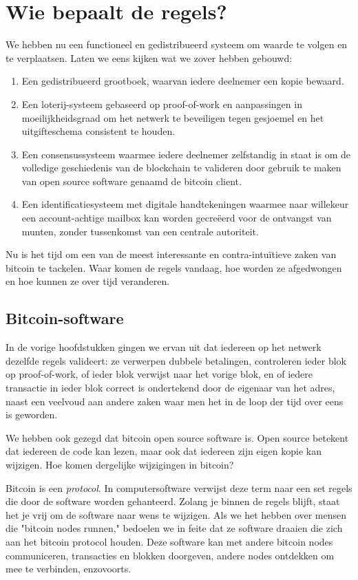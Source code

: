\documentclass[smalldemyvopaper,11pt,twoside,onecolumn,openright,extrafontsizes]{memoir}
\begin{document}
\chapter{Wie bepaalt de regels?}

We hebben nu een functioneel en gedistribueerd systeem om waarde te volgen en te verplaatsen. Laten we eens kijken wat we zover hebben gebouwd:

\begin{enumerate}
    \item Een gedistribueerd grootboek, waarvan iedere deelnemer een kopie bewaard.
    \item Een loterij-systeem gebaseerd op proof-of-work en aanpassingen in moeilijkheidsgraad om het netwerk te beveiligen tegen gesjoemel en het uitgifteschema consistent te houden.
    \item Een consensussysteem waarmee iedere deelnemer zelfstandig in staat is om de volledige geschiedenis van de blockchain te valideren door gebruik te maken van open source software genaamd de bitcoin client. 
    \item Een identificatiesysteem met digitale handtekeningen waarmee naar willekeur een account-achtige mailbox kan worden gecreëerd voor de ontvangst van munten, zonder tussenkomst van een centrale autoriteit.
\end{enumerate}

Nu is het tijd om een van de meest interessante en contra-intuïtieve zaken van bitcoin te tackelen. Waar komen de regels vandaag, hoe worden ze afgedwongen en hoe kunnen ze over tijd veranderen. 

\section{Bitcoin-software}

In de vorige hoofdstukken gingen we ervan uit dat iedereen op het netwerk dezelfde regels valideert: ze verwerpen dubbele betalingen, controleren ieder blok op proof-of-work, of ieder blok verwijst naar het vorige blok, en of iedere transactie in ieder blok correct is ondertekend door de eigenaar van het adres, naast een veelvoud aan andere zaken waar men het in de loop der tijd over eens is geworden. 

We hebben ook gezegd dat bitcoin open source software is. Open source betekent dat iedereen de code kan lezen, maar ook dat iedereen zijn eigen kopie kan wijzigen. Hoe komen dergelijke wijzigingen in bitcoin?

Bitcoin is een \textit{protocol}. In computersoftware verwijst deze term naar een set regels die door de software worden gehanteerd. Zolang je binnen de regels blijft, staat het je vrij om de software naar wens te wijzigen. Als we het hebben over mensen die "bitcoin nodes runnen," bedoelen we in feite dat ze software draaien die zich aan het bitcoin protocol houden. Deze software kan met andere bitcoin nodes communiceren, transacties en blokken doorgeven, andere nodes ontdekken om mee te verbinden, enzovoorts.   
\end{document}
